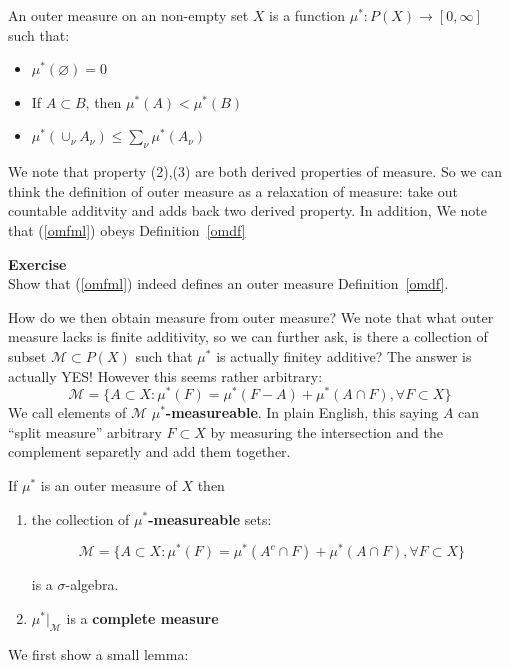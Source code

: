 \begin{definition}\label{omdf}An outer measure on an non-empty set $X$ is a function $\mu^* : P(X)\to [0,\infty]$ such that:

\begin{itemize}
\item $\mu^*(\varnothing)=0$
\item If $A\subset B$, then $\mu^*(A)<\mu^*(B)$
\item $\mu^*(\cup_{\nu}A_{\nu})\leq \sum_{\nu} \mu^* (A_{\nu })$
\end{itemize}

\end{definition}We note that property (2),(3) are both derived properties of measure. So we can think the definition of outer measure as a relaxation of measure: take out countable additvity and adds back two derived property. In addition,  We note that (\ref{omfml}) obeys Definition~\ref{omdf}

\begin{framed}
\textbf{Exercise}\\
Show that (\ref{omfml}) indeed defines an outer measure Definition~\ref{omdf}.
\end{framed}

How do we then obtain measure from outer measure? We note that what outer measure lacks is finite additivity, so we can further ask, is there a collection of subset $\mathcal {M}\subset P(X)$ such that $\mu^*$ is actually finitey additive? The answer is actually YES! However this seems rather arbitrary:
\begin{equation}
\mathcal M = \{A\subset X: \mu^*(F)=\mu^*(F-A)+\mu^*(A\cap F), \forall F \subset X\}
\end{equation}
We call elements of $\mathcal M$ \textbf{$\mu^*$-measureable}. In plain English, this saying $A$ can ``split measure'' arbitrary $F\subset X$ by measuring the intersection and the complement separetly and add them together.

\begin{theorem}If $\mu^*$ is an outer measure of $X$ then

\begin{enumerate}
\item the collection of \textbf{$\mu^*$-measureable} sets:

\begin{equation}
\mathcal M = \{A\subset X: \mu^*(F)=\mu^*(A^c \cap F)+\mu^*(A\cap F), \forall F \subset X\}
\end{equation}


is a $\sigma$-algebra.


\item $\mu^*|_{\mathcal M}$ is a \textbf{complete measure}
\end{enumerate}

\end{theorem}We first show a small lemma:


